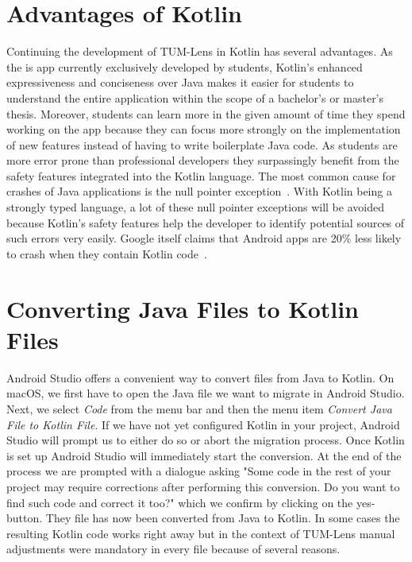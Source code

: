 \documentclass[
			   fontsize=11pt,
               paper=a4,
               bibliography=totoc,
               idxtotoc,
               headsepline,
               footsepline,
               footinclude=false,
               BCOR=12mm,
               DIV=13,
               openany,   %
               ]
               {scrbook}
\begin{document}
\section{Advantages of Kotlin}
Continuing the development of TUM-Lens in Kotlin has several advantages. As the is app currently exclusively developed by students, Kotlin's enhanced expressiveness and conciseness over Java makes it easier for students to understand the entire application within the scope of a bachelor's or master's thesis. Moreover, students can learn more in the given amount of time they spend working on the app because they can focus more strongly on the implementation of new features instead of having to write boilerplate Java code. As students are more error prone than professional developers they surpassingly benefit from the safety features integrated into the Kotlin language. The most common cause for crashes of Java applications is the null pointer exception~\cite{nullPointerSamebug, nullPointerOverops}. With Kotlin being a strongly typed language, a lot of these null pointer exceptions will be avoided because Kotlin's safety features help the developer to identify potential sources of such errors very easily. Google itself claims that Android apps are 20\% less likely to crash when they contain Kotlin code~\cite{kotlinFirst}.

\section{Converting Java Files to Kotlin Files}

Android Studio offers a convenient way to convert files from Java to Kotlin. On macOS, we first have to open the Java file we want to migrate in Android Studio. Next, we select \textit{Code} from the menu bar and then the menu item \textit{Convert Java File to Kotlin File}. If we have not yet configured Kotlin in your project, Android Studio will prompt us to either do so or abort the migration process. Once Kotlin is set up Android Studio will immediately start the conversion. At the end of the process we are prompted with a dialogue asking "Some code in the rest of your project may require corrections after performing this conversion. Do you want to find such code and correct it too?" which we confirm by clicking on the yes-button. They file has now been converted from Java to Kotlin. In some cases the resulting Kotlin code works right away but in the context of TUM-Lens manual adjustments were mandatory in every file because of several reasons. \\
\end{document}
